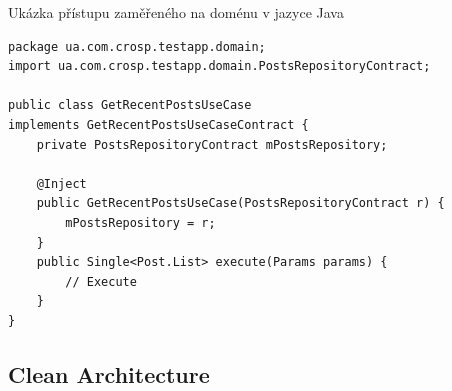 \begin{listing}
    \caption{Ukázka přístupu zaměřeného na doménu v jazyce Java \cite{architecture}}
    \label{code:architecture-domain}
    \begin{verbatim}
package ua.com.crosp.testapp.domain;
import ua.com.crosp.testapp.domain.PostsRepositoryContract;

public class GetRecentPostsUseCase
implements GetRecentPostsUseCaseContract {
    private PostsRepositoryContract mPostsRepository;

    @Inject
    public GetRecentPostsUseCase(PostsRepositoryContract r) {
        mPostsRepository = r;
    }
    public Single<Post.List> execute(Params params) {
        // Execute
    }
}
    \end{verbatim}
\end{listing}

\subsection{Clean Architecture}


 \cite{martin_clean_architecture}


 







